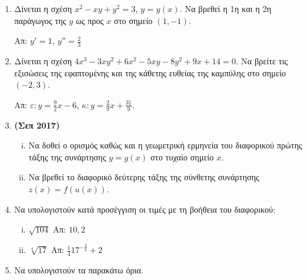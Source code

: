 \begin{enumerate}
  \item Δίνεται η σχέση $ x^{2} - xy + y^{2} = 3 $, $ y=y(x) $. Να βρεθεί η 1η
    και η 2η παράγωγος της $y$ ως προς $x$ στο σημείο $ (1,-1) $.

    \hfill Απ: $ y' = 1$, $ y'' = \frac{2}{3} $

  \item Δίνεται η σχέση $ 4x^{3} - 3xy^{2} + 6x^{2} - 5xy - 8 y^{2} + 9x + 14
    = 0$. Να βρείτε τις εξισώσεις της εφαπτομένης και της κάθετης ευθείας
    της καμπύλης στο σημείο $ (-2,3) $.

    \hfill Απ: $\varepsilon\colon y = \frac{9}{2} x - 6 $, 
    $\kappa\colon y = \frac{2}{9} x + \frac{31}{9} $.

  \item {\bfseries (Σεπ 2017)}
    \begin{enumerate}[i)]
      \item Να δοθεί ο ορισμός καθώς και η γεωμετρική
        ερμηνεία του διαφορικού πρώτης τάξης της συνάρτησης $ y = g(x) $ στο
        τυχαίο σημείο $x$. 
      \item Να βρεθεί το διαφορικό δεύτερης τάξης της σύνθετης συνάρτησης $ z(x) =
        f(u(x))	$.
    \end{enumerate}

  \item Να υπολογιστούν κατά προσέγγιση οι τιμές με τη βοήθεια του διαφορικού:
    \begin{enumerate}[i)]
      \item $\sqrt{104}$ \hfill Απ: $10,2$
      \item $\sqrt[4]{17}$ \hfill Απ: $\frac{1}{4}17^{-\frac{3}{4}}+2$
    \end{enumerate}

  \item Να υπολογιστούν τα παρακάτω όρια.
    \begin{enumerate}[(i)]
    \end{enumerate}


\end{enumerate}
